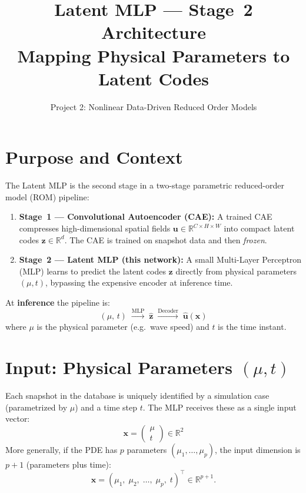 \documentclass[11pt,a4paper]{article}
\title{Latent MLP --- Stage~2 Architecture\\[0.5em]
\large Mapping Physical Parameters to Latent Codes}
\author{Project 2: Nonlinear Data-Driven Reduced Order Models}
\date{}
\newcommand{\R}{\mathbb{R}}
\newcommand{\bz}{\mathbf{z}}
\newcommand{\bx}{\mathbf{x}}
\begin{document}
\maketitle

\section{Purpose and Context}

The Latent MLP is the second stage in a two-stage parametric reduced-order
model (ROM) pipeline:
%
\begin{enumerate}[leftmargin=2em]
  \item \textbf{Stage~1 --- Convolutional Autoencoder (CAE):}  
    A trained CAE compresses high-dimensional spatial fields
    $\mathbf{u} \in \R^{C \times H \times W}$ into compact latent codes
    $\bz \in \R^{d}$.  The CAE is trained on snapshot data and then
    \emph{frozen}.
  \item \textbf{Stage~2 --- Latent MLP (this network):}  
    A small Multi-Layer Perceptron (MLP) learns to predict the latent codes
    $\bz$ directly from physical parameters $(\mu, t)$, bypassing the
    expensive encoder at inference time.
\end{enumerate}

At \textbf{inference} the pipeline is:
\[
  (\mu,\, t)
  \;\xrightarrow{\text{MLP}}\;
  \hat{\bz}
  \;\xrightarrow{\text{Decoder}}\;
  \hat{\mathbf{u}}(\mathbf{x})
\]
where $\mu$ is the physical parameter (e.g.\ wave speed) and $t$ is the
time instant.

\section{Input: Physical Parameters \texorpdfstring{$(\mu, t)$}{(mu, t)}}

Each snapshot in the database is uniquely identified by a simulation
case (parametrized by $\mu$) and a time step $t$.  The MLP receives
these as a single input vector:
\[
  \bx = \begin{pmatrix} \mu \\ t \end{pmatrix} \in \R^{2}
\]
More generally, if the PDE has $p$ parameters $(\mu_1,\ldots,\mu_p)$,
the input dimension is $p+1$ (parameters plus time):
\[
  \bx = (\mu_1,\;\mu_2,\;\ldots,\;\mu_p,\;t)^{\!\top} \in \R^{p+1}.
\]
\end{document}
